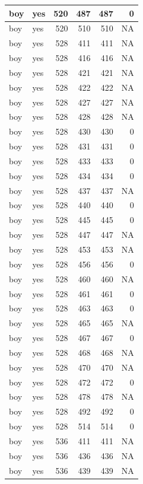 \documentclass[man]{apa6}
\begin{document}
\begin{tabular}{l|l|r|r|r|r}
\hline
boy & yes & 520 & 487 & 487 & 0\\
\hline
boy & yes & 520 & 510 & 510 & NA\\
\hline
boy & yes & 528 & 411 & 411 & NA\\
\hline
boy & yes & 528 & 416 & 416 & NA\\
\hline
boy & yes & 528 & 421 & 421 & NA\\
\hline
boy & yes & 528 & 422 & 422 & NA\\
\hline
boy & yes & 528 & 427 & 427 & NA\\
\hline
boy & yes & 528 & 428 & 428 & NA\\
\hline
boy & yes & 528 & 430 & 430 & 0\\
\hline
boy & yes & 528 & 431 & 431 & 0\\
\hline
boy & yes & 528 & 433 & 433 & 0\\
\hline
boy & yes & 528 & 434 & 434 & 0\\
\hline
boy & yes & 528 & 437 & 437 & NA\\
\hline
boy & yes & 528 & 440 & 440 & 0\\
\hline
boy & yes & 528 & 445 & 445 & 0\\
\hline
boy & yes & 528 & 447 & 447 & NA\\
\hline
boy & yes & 528 & 453 & 453 & NA\\
\hline
boy & yes & 528 & 456 & 456 & 0\\
\hline
boy & yes & 528 & 460 & 460 & NA\\
\hline
boy & yes & 528 & 461 & 461 & 0\\
\hline
boy & yes & 528 & 463 & 463 & 0\\
\hline
boy & yes & 528 & 465 & 465 & NA\\
\hline
boy & yes & 528 & 467 & 467 & 0\\
\hline
boy & yes & 528 & 468 & 468 & NA\\
\hline
boy & yes & 528 & 470 & 470 & NA\\
\hline
boy & yes & 528 & 472 & 472 & 0\\
\hline
boy & yes & 528 & 478 & 478 & NA\\
\hline
boy & yes & 528 & 492 & 492 & 0\\
\hline
boy & yes & 528 & 514 & 514 & 0\\
\hline
boy & yes & 536 & 411 & 411 & NA\\
\hline
boy & yes & 536 & 436 & 436 & NA\\
\hline
boy & yes & 536 & 439 & 439 & NA\\

\end{tabular}
\end{document}
